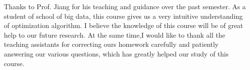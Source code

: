 \documentclass[11pt,en,authoryear]{elegantpaper}
\numberwithin{equation}{section}
\begin{document}
Thanks to Prof. Jiang for his teaching and guidance over the past semester. As a student of school of big data, this course gives us a very intuitive understanding of optimization algorithm. I believe the knowledge of this course will be of great help to our future research. At the same time,I would like to thank all the teaching assistants for correcting ours homework carefully and patiently answering our various questions, which has greatly helped our study of this course.

\newpage


\end{document}
